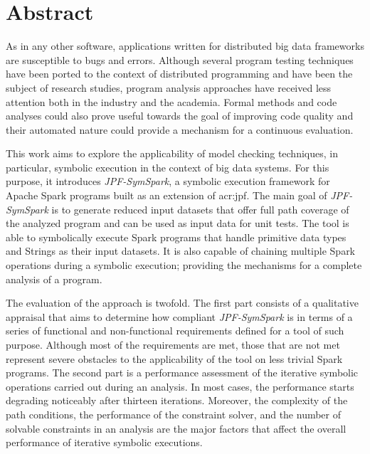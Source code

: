 \section*{Abstract}


As in any other software, applications written for distributed big data frameworks are susceptible to bugs and errors. Although several program testing techniques have been ported to the context of distributed programming and have been the subject of research studies, program analysis approaches have received less attention both in the industry and the academia. Formal methods and code analyses could also prove useful towards the goal of improving code quality and their automated nature could provide a mechanism for a continuous evaluation.

This work aims to explore the applicability of model checking techniques, in particular, symbolic execution in the context of big data systems. For this purpose, it introduces \textit{JPF-SymSpark}, a symbolic execution framework for Apache Spark programs built as an extension of \acrlong{acr:jpf}. The main goal of \textit{JPF-SymSpark} is to generate reduced input datasets that offer full path coverage of the analyzed program and can be used as input data for unit tests. The tool is able to symbolically execute Spark programs that handle primitive data types and Strings as their input datasets. It is also capable of chaining multiple Spark operations during a symbolic execution; providing the mechanisms for a complete analysis of a program.

The evaluation of the approach is twofold. The first part consists of a qualitative appraisal that aims to determine how compliant \textit{JPF-SymSpark} is in terms of a series of functional and non-functional requirements defined for a tool of such purpose. Although most of the requirements are met, those that are not met represent severe obstacles to the applicability of the tool on less trivial Spark programs. The second part is a performance assessment of the iterative symbolic operations carried out during an analysis. In most cases, the performance starts degrading noticeably after thirteen iterations. Moreover, the complexity of the path conditions, the performance of the constraint solver, and the number of solvable constraints in an analysis are the major factors that affect the overall performance of iterative symbolic executions.